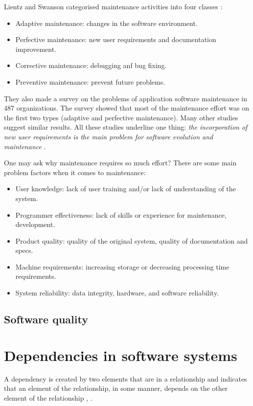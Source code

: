 \documentclass[12pt]{mitthesis}
\begin{document}
Lientz and Swanson categorised maintenance activities into four classes \cite{Lientz:1981:PAS:358790.358796}:
\begin{itemize}
\item Adaptive maintenance: changes in the software environment.
\item Perfective maintenance: new user requirements and documentation improvement.
\item Corrective maintenance: debugging anf bug fixing.
\item Preventive maintenance: prevent future problems.
\end{itemize}

They also made a survey on the problems of application software maintenance in 487 organizations. The survey showed that most of the maintenance effort was on the first two types (adaptive and perfective maintenance). Many other studies suggest similar results.\cite{Bennett}
All these studies underline one thing: \textit{the incorporation of new user requirements is the main problem for software evolution and maintenance} \cite{Lientz:1981:PAS:358790.358796}.

One may ask why maintenance requires so much effort? There are some main problem factors when it comes to maintenance:

\begin{itemize}
\item User knowledge: lack of user training and/or lack of understanding of the system.
\item Programmer effectiveness: lack of skills or experience for maintenance, development.
\item Product quality: quality of the original system, quality of documentation and specs.
\item Machine requirements: increasing storage or decreasing processing time requirements.
\item System reliability: data integrity, hardware, and software reliability.
\end{itemize}

\section{Software quality}

\chapter{Dependencies in software systems}
A dependency is created by two elements that are in a relationship and indicates that an element of the relationship, in some manner, depends on the other element of the relationship \cite{Booch:2004:OAD:975416}, \cite{Cataldo2009SoftwareDW}.
\end{document}
